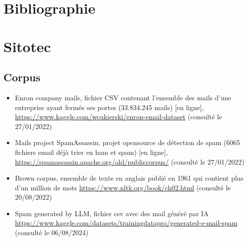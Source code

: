 \documentclass[a4paper,12pt]{article}
\begin{document}
	\section{Bibliographie}
		\label{sec:bibliographie}
		
		
	\newpage


	\section{Sitotec}
		\subsection{Corpus}
			\begin{itemize}
				\item Enron company mails, fichier CSV contenant l'ensemble des mails d'une entreprise ayant fermée ses portes (33.834.245 mails) [en ligne], \url{https://www.kaggle.com/wcukierski/enron-email-dataset} (consulté le 27/01/2022) \label{Enron_dataset}
				\item Mails project SpamAssassin, projet opensource de détection de spam (6065 fichiers email déjà trier en ham et spam) [en ligne], \url{https://spamassassin.apache.org/old/publiccorpus/} (consulté le 27/01/2022) \label{SpamAssassin_dataset}
				\item Brown corpus, ensemble de texte en anglais publié en 1961 qui contient plus d'un million de mots \url{https://www.nltk.org/book/ch02.html} (consulté le 20/08/2022) \label{Brown_corpus}
				\item Spam generated by LLM, fichier csv avec des mail généré par IA \url{https://www.kaggle.com/datasets/trainingdatapro/generated-e-mail-spam} (consulté le 06/08/2024) \label{spamLLM}
			\end{itemize}
		
\end{document}
